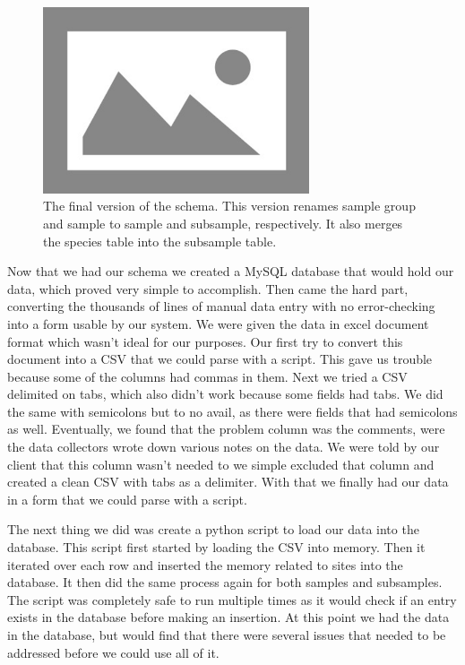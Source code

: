 \documentclass[10pt,draftclsnofoot,onecolumn]{IEEEtran}
\begin{document}
\begin{figure}[h]
	\centering
	\includegraphics[width=0.70\textwidth]{images/new_schema.png}
	\captionsetup{justification=centering}
	\caption{
		The final version of the schema.
		This version renames sample group and sample to sample and subsample, respectively.
		It also merges the species table into the subsample table.
	}
	\label{fig:new_schema}
\end{figure}

Now that we had our schema we created a MySQL database that would hold our data, which proved very simple to accomplish.
Then came the hard part, converting the thousands of lines of manual data entry with no error-checking into a form usable by our system.
We were given the data in excel document format which wasn't ideal for our purposes.
Our first try to convert this document into a CSV that we could parse with a script.
This gave us trouble because some of the columns had commas in them.
Next we tried a CSV delimited on tabs, which also didn't work because some fields had tabs.
We did the same with semicolons but to no avail, as there were fields that had semicolons as well.
Eventually, we found that the problem column was the comments, were the data collectors wrote down various notes on the data.
We were told by our client that this column wasn't needed to we simple excluded that column and created a clean CSV with tabs as a delimiter.
With that we finally had our data in a form that we could parse with a script.

The next thing we did was create a python script to load our data into the database.
This script first started by loading the CSV into memory.
Then it iterated over each row and inserted the memory related to sites into the database.
It then did the same process again for both samples and subsamples.
The script was completely safe to run multiple times as it would check if an entry exists in the database before making an insertion.
At this point we had the data in the database, but would find that there were several issues that needed to be addressed before we could use all of it.
\end{document}
